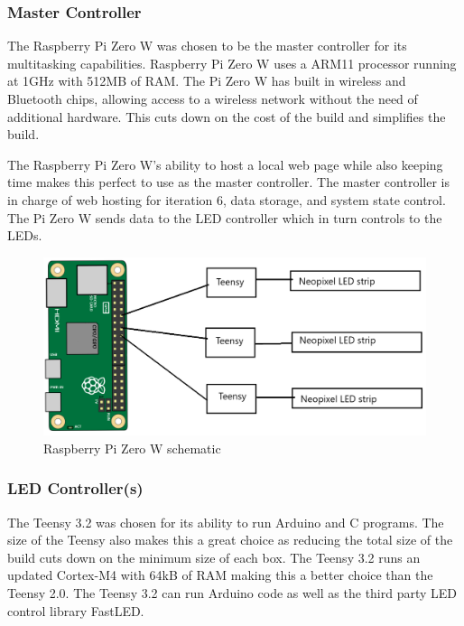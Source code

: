 \documentclass[onecolumn, draftclsnofoot,10pt, compsoc]{IEEEtran}
\begin{document}
			\subsubsection{Master Controller}
			\noindent The Raspberry Pi Zero W was chosen to be the master controller for its
			multitasking capabilities. Raspberry Pi Zero W uses a ARM11 processor
			running at 1GHz with 512MB of RAM. \cite{pizero} The Pi Zero W has built in wireless and
			Bluetooth chips, allowing access to a wireless network without the need
			of additional hardware. This cuts down on the cost of the build and
			simplifies the build.

			\noindent The Raspberry Pi Zero W's ability to host a local web page while also
			keeping time makes this perfect to use as the master controller. The
			master controller is in charge of web hosting for iteration 6,
			data storage, and system state control. The Pi Zero W sends data to the LED controller which in turn controls
			to the LEDs.
			\begin{center}
				\begin{figure}[H]
					\includegraphics[width=\linewidth]{systemDiagrams/pischem.png}
					\caption{Raspberry Pi Zero W schematic}
					\label{fig:piSchematic}
				\end{figure}
			\end{center}
			\subsubsection{LED Controller(s)}
			\noindent The Teensy 3.2 was chosen for its ability to run Arduino and C programs.
			The size of the Teensy also makes this a great choice as reducing the
			total size of the build cuts down on the minimum size of each box.
			The Teensy 3.2 runs an updated Cortex-M4 with 64kB of RAM making this a
			better choice than the Teensy 2.0.\cite{atmel} The Teensy 3.2 can run Arduino code as well as the third party LED control library FastLED.
\end{document}
